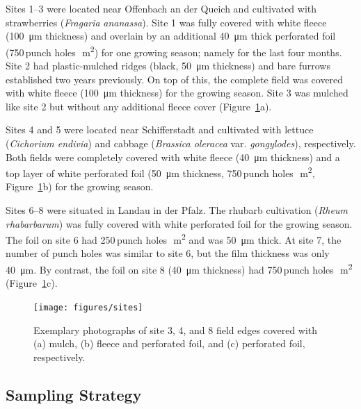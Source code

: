 Sites 1--3 were located near \foreignlanguage{ngerman}{Offenbach an der Queich} and cultivated with strawberries (\textit{Fragaria\,\texttimes\,ananassa}). Site 1 was fully covered with white fleece (\SI{100}{\micro\meter} thickness) and overlain by an additional \SI{40}{\micro\meter} thick perforated foil (750\,punch holes\,\si{\per\meter\squared}) for one growing season; namely for the last four months. Site 2 had plastic-mulched ridges (black, \SI{50}{\micro\meter} thickness) and bare furrows established two years previously. On top of this, the complete field was covered with white fleece (\SI{100}{\micro\meter} thickness) for the growing season. Site 3 was mulched like site 2 but without any additional fleece cover (Figure~\ref{fig:sites}a).

Sites 4 and 5 were located near \foreignlanguage{ngerman}{Schifferstadt} and cultivated with lettuce (\textit{Cichorium endivia}) and cabbage (\textit{Brassica oleracea} var. \textit{gongylodes}), respectively. Both fields were completely covered with white fleece (\SI{40}{\micro\meter} thickness) and a top layer of white perforated foil (\SI{50}{\micro\meter} thickness, \num{750}\,punch holes\,\si{\per\meter\squared}, Figure~\ref{fig:sites}b) for the growing season.

Sites 6--8 were situated in \foreignlanguage{ngerman}{Landau in der Pfalz}. The rhubarb cultivation (\textit{Rheum rhabarbarum}) was fully covered with white perforated foil for the growing season. The foil on site 6 had 250\,punch holes\,\si{\per\meter\squared} and was \SI{50}{\micro\meter} thick. At site 7, the number of punch holes was similar to site 6, but the film thickness was only \SI{40}{\micro\meter}. By contrast, the foil on site 8 (\SI{40}{\micro\meter} thickness) had \num{750}\,punch holes\,\si{\per\meter\squared} (Figure~\ref{fig:sites}c).

\begin{figure}
	\centering
	\texttt{[image: figures/sites]}
	\caption[Exemplary photographs of the experimental sites.]{Exemplary photographs of site 3, 4, and 8 field edges covered with (a) mulch, (b) fleece and perforated foil, and (c) perforated foil, respectively.}
	\label{fig:sites}
\end{figure}

\subsection{Sampling Strategy}

